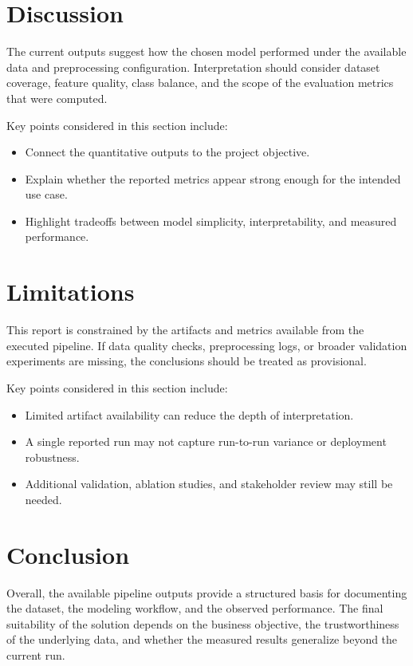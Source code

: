 \documentclass[11pt]{article}
\begin{document}
\section{Discussion}
The current outputs suggest how the chosen model performed under the available data and preprocessing configuration. Interpretation should consider dataset coverage, feature quality, class balance, and the scope of the evaluation metrics that were computed.

Key points considered in this section include:

\begin{itemize}
\item Connect the quantitative outputs to the project objective.
\item Explain whether the reported metrics appear strong enough for the intended use case.
\item Highlight tradeoffs between model simplicity, interpretability, and measured performance.
\end{itemize}


\section{Limitations}
This report is constrained by the artifacts and metrics available from the executed pipeline. If data quality checks, preprocessing logs, or broader validation experiments are missing, the conclusions should be treated as provisional.

Key points considered in this section include:

\begin{itemize}
\item Limited artifact availability can reduce the depth of interpretation.
\item A single reported run may not capture run-to-run variance or deployment robustness.
\item Additional validation, ablation studies, and stakeholder review may still be needed.
\end{itemize}


\section{Conclusion}
Overall, the available pipeline outputs provide a structured basis for documenting the dataset, the modeling workflow, and the observed performance. The final suitability of the solution depends on the business objective, the trustworthiness of the underlying data, and whether the measured results generalize beyond the current run.
\end{document}
